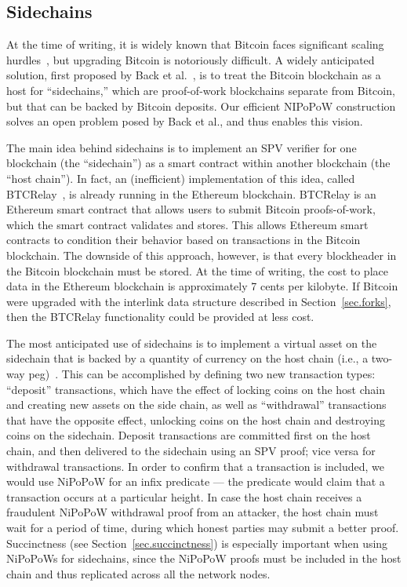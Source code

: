 \subsection{Sidechains}
\label{sec.sidechains}
At the time of writing, it is widely known that Bitcoin faces significant scaling hurdles~\cite{onscaling}, but upgrading Bitcoin is notoriously difficult.
A widely anticipated solution, first proposed by Back et al.~\cite{sidechains}, is to treat the Bitcoin blockchain as a host for ``sidechains,'' which are proof-of-work blockchains separate from Bitcoin, but that can be backed by Bitcoin deposits. Our efficient NIPoPoW construction solves an open problem posed by Back et al., and thus enables this vision.

The main idea behind sidechains is to implement an SPV verifier for one blockchain (the ``sidechain'') as a smart contract within another blockchain (the ``host chain''). In fact, an (inefficient) implementation of this idea, called BTCRelay~\cite{ethereum}, is already running in the Ethereum blockchain. BTCRelay is an Ethereum smart contract that allows users to submit Bitcoin proofs-of-work, which the smart contract validates and stores. This allows Ethereum smart contracts to condition their behavior based on transactions in the Bitcoin blockchain.
 The downside of this approach, however, is that every blockheader in the Bitcoin blockchain must be stored. At the time of writing, the cost to place data in the Ethereum blockchain is approximately 7 cents per kilobyte. If Bitcoin were upgraded with the interlink data structure described in Section~\ref{sec.forks}, then the BTCRelay functionality could be provided at less cost. 

The most anticipated use of sidechains is to implement a virtual asset on the sidechain that is backed by a quantity of currency on the host chain (i.e., a two-way peg)~\cite{sidechains}. This can be accomplished by defining two new transaction types: ``deposit'' transactions, which have the effect of locking coins on the host chain and creating new assets on the side chain, as well as ``withdrawal'' transactions that have the opposite effect, unlocking coins on the host chain and destroying coins on the sidechain. Deposit transactions are committed first on the host chain, and then delivered to the sidechain using an SPV proof; vice versa for withdrawal transactions. In order to confirm that a transaction is included, we would use NiPoPoW for an infix predicate --- the predicate would claim that a transaction occurs at a particular height. In case the host chain receives a fraudulent NiPoPoW withdrawal proof from an attacker, the host chain must wait for a period of time, during which honest parties may submit a better proof. Succinctness (see Section~\ref{sec.succinctness}) is especially important when using NiPoPoWs for sidechains, since the NiPoPoW proofs must be included in the host chain and thus replicated across all the network nodes. 
